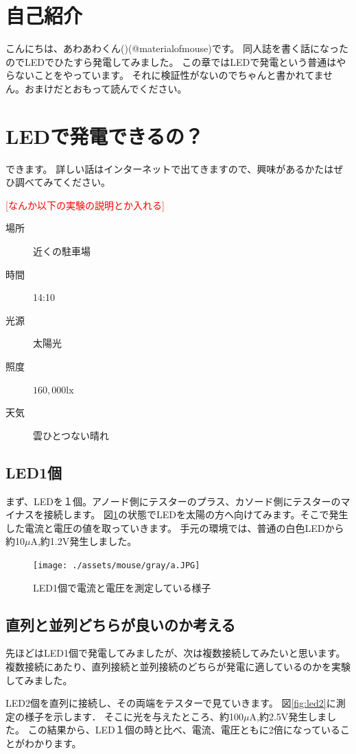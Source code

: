 \section{自己紹介}
こんにちは、あわあわくん()(@materialofmouse)です。
同人誌を書く話になったのでLEDでひたすら発電してみました。
この章ではLEDで発電という普通はやらないことをやっています。
それに検証性がないのでちゃんと書かれてません。おまけだとおもって読んでください。

\section{LEDで発電できるの？}
できます。
詳しい話はインターネットで出てきますので、興味があるかたはぜひ調べてみてください。

\textcolor{red}{[なんか以下の実験の説明とか入れる]}
\begin{description}
  \item[場所]{近くの駐車場}
  \item[時間]{14:10}
  \item[光源]{太陽光}
  \item[照度]{$160,000\si\lux$}
  \item[天気]{雲ひとつない晴れ}
\end{description}


\subsection{LED1個}
まず、LEDを１個。アノード側にテスターのプラス、カソード側にテスターのマイナスを接続します。
図\ref{fig:led1}の状態でLEDを太陽の方へ向けてみます。そこで発生した電流と電圧の値を取っていきます。
手元の環境では、普通の白色LEDから約10$\mu\si\ampere$,約1.2$\si\volt$発生しました。

\begin{figure}[htbp]
    \centering
    \texttt{[image: ./assets/mouse/gray/a.JPG]}
    \caption{LED1個で電流と電圧を測定している様子}
    \label{fig:led1}
\end{figure}

\subsection{直列と並列どちらが良いのか考える}
先ほどはLED1個で発電してみましたが、次は複数接続してみたいと思います。
複数接続にあたり、直列接続と並列接続のどちらが発電に適しているのかを実験してみました。

LED2個を直列に接続し、その両端をテスターで見ていきます。
図\ref{fig:led2}に測定の様子を示します．
そこに光を与えたところ、約100$\mu\si\ampere$,約2.5$\si\volt$発生しました。
この結果から、LED１個の時と比べ、電流、電圧ともに2倍になっていることがわかります。

